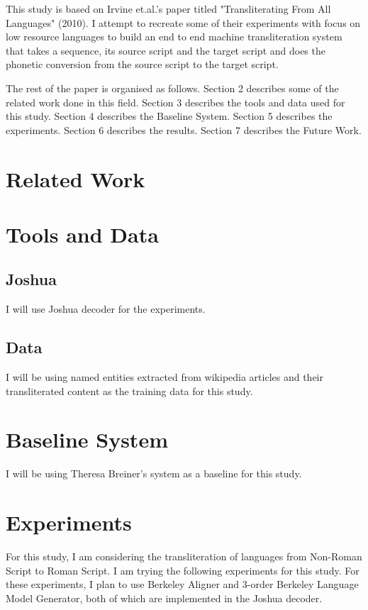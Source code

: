 \documentclass[11pt,a4paper]{article}
\begin{document}
\par
This study is based on Irvine et.al.'s paper titled "Transliterating From All Languages" (2010). I attempt to recreate some of their experiments with focus on low resource languages to build an end to end machine transliteration system that takes a sequence, its source script and the target script and does the phonetic conversion from the source script to the target script.
\par
The rest of the paper is organised as follows. Section 2 describes some of the related work done in this field. Section 3 describes the tools and data used for this study. Section 4 describes the Baseline System. Section 5 describes the experiments. Section 6 describes the results. Section 7 describes the Future Work.

\section{Related Work}

\section{Tools and Data}

\subsection{Joshua}
I will use Joshua decoder for the experiments.

\subsection{Data}
I will be using named entities extracted from wikipedia articles and their transliterated content as the training data for this study.

\section{Baseline System}
I will be using Theresa Breiner's system as a baseline for this study.

\section{Experiments}
For this study, I am considering the transliteration of languages from Non-Roman Script to Roman Script. I am trying the following experiments for this study. For these experiments, I plan to use Berkeley Aligner and 3-order Berkeley Language Model Generator, both of which are implemented in the Joshua decoder.
\end{document}
